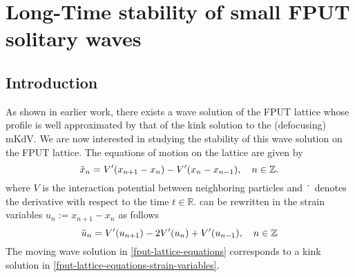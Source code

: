 \chapter{Long-Time stability of small FPUT solitary waves}
\label{chp:long-time-stability}
\pagestyle{myheadings}

\section{Introduction}

As shown in earlier work, there exists a wave solution of the FPUT lattice whose profile is well approximated by that of the kink solution to the (defocusing) mKdV. We are now interested in studying the stability of this wave solution on the FPUT lattice. The equations of motion on the lattice are given by 
\begin{equation}\label{fput-lattice-equations}
	\ddot x_n = V'(x_{n+1} - x_n) - V'(x_n - x_{n-1}), \quad n \in \mathbb{Z}.
\end{equation}
where \(V\) is the interaction potential between neighboring particles and \(\dot{\hspace{0.5em}}\) denotes the derivative with respect to the time \(t\in \mathbb{R}\).  can be rewritten in the strain variables \(u_n := x_{n+1} - x_n\) as follows
\begin{equation}\label{fput-lattice-equations-strain-variables}
	\ddot{u}_n = V'(u_{n+1}) - 2 V'(u_n) + V'(u_{n-1}), \quad n \in \mathbb{Z}
\end{equation}
The moving wave solution in \cref{fput-lattice-equations} corresponds to a kink solution in \cref{fput-lattice-equations-strain-variables}.

